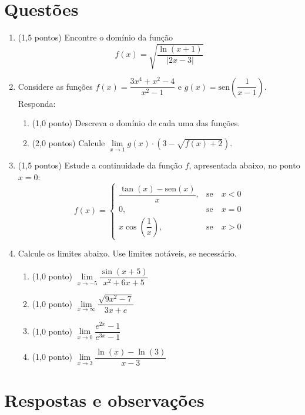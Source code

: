 \documentclass[12pt,a4paper]{article}
\begin{document}
\section*{Questões}
\begin{enumerate}

\item (1,5 pontos) Encontre o domínio da função
\[
f(x)= \sqrt{\dfrac{\ln(x+1)}{|2x-3|}}
\]

\item Considere as funções $f(x)=\dfrac{3x^4+x^2-4}{x^2-1}$ e $g(x)=\text{sen}\left(\dfrac{1}{x-1}\right)$. Responda:

\begin{enumerate}
\item (1,0 ponto) Descreva o domínio de cada uma das funções.
\item (2,0 pontos) Calcule $\lim\limits_{x\to 1}g(x)\cdot\left(3-\sqrt{f(x)+2}\right)$.
\end{enumerate}



\item (1,5 pontos) Estude a continuidade da função $f$, apresentada abaixo, no ponto $x=0$:
\[f(x)=\left\{\begin{array}{ll}
\dfrac{\tan(x)-\text{sen}(x)}{x}, & \text{se}\quad x<0\\
0, & \text{se}\quad x=0 \\
x\cos\left(\dfrac{1}{x}\right), & \text{se}\quad x>0
\end{array}\right. \]


\item Calcule os limites abaixo. Use limites notáveis, se necessário.

\begin{enumerate}
\item (1,0 ponto) \quad $\lim\limits_{x\to -5 }\dfrac{\sin(x+5)}{x^2+6x+5}$
\item (1,0 ponto) \quad $\lim\limits_{x\to \infty} \dfrac{\sqrt{9x^2-7}}{3x+e}$
\item (1,0 ponto) \quad $\lim\limits_{x\to 0} \dfrac{e^{2x}-1}{e^{3x}-1} $
\item (1,0 ponto) \quad $\lim\limits_{x\to 3} \dfrac{\ln(x)-\ln(3)}{x-3}  $
\end{enumerate}
\end{enumerate}

\newpage
\restoregeometry
\section*{Respostas e observações}
\end{document}
